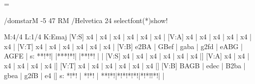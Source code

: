 \documentclass[a4paper,twoside]{article}
\begin{document}
\choralwithstar=\choral
\begin{abcsvgmoreprefix}{\choralwithstar}
  /domstar{M -5 47 RM /Helvetica 24 selectfont(*)show}!
\end{abcsvgmoreprefix}
\par\nopagebreak
{}
\begin{abcsvg}
  M:4/4
  L:1/4
  K:Emaj
  [V:S] x4   | x4   | x4   | x4   | x4   | x4   |
  [V:A] x4   | x4   | x4   | x4   | x4   | x4   |
  [V:T] x4   | x4   | x4   | x4   | x4   | x4   |
  [V:B] e2BA | GBef | gaba | g2fd | eABG | AGFE |
  s:    **!*!|      |***!*!|      |**!*! |      |
  [V:S] x4   | x4   | x4   | x4   | x4   | x4   |]
  [V:A] x4   | x4   | x4   | x4   | x4   | x4   |]
  [V:T] x4   | x4   | x4   | x4   | x4   | x4   |]
  [V:B] BAGB | edec | B2ba | gbea | g2fB | e4   |]
  s:    *!*! | *!*! | **!*!|*!*!*!*!|*!*!!*!|   |
\end{abcsvg}
\end{document}
